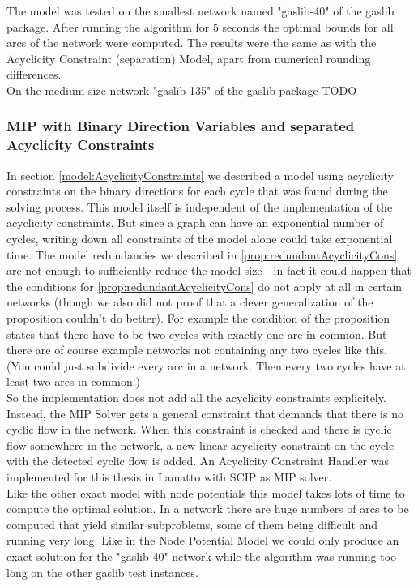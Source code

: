 The model was tested on the smallest network named "gaslib-40" of the gaslib package. After running the algorithm for 5 
seconds the optimal bounds for all arcs of the network were computed. The results were the same as with the Acyclicity 
Constraint (separation) Model, apart from numerical rounding differences. \\

On the medium size network "gaslib-135" of the gaslib package TODO


\subsubsection{MIP with Binary Direction Variables and separated Acyclicity Constraints}
In section \ref{model:AcyclicityConstraints} we described a model using acyclicity constraints on the binary directions 
for each cycle that was found during the solving process.
This model itself is independent of the implementation of the acyclicity constraints. But since a graph can have an 
exponential number of cycles, writing down all constraints of the model alone could take exponential time. The 
model redundancies we described in \ref{prop:redundantAcyclicityCons} are not enough to sufficiently reduce the model 
size - in fact it could happen that the conditions for \ref{prop:redundantAcyclicityCons} do not apply at all in 
certain networks (though we also did not proof that a clever generalization of the proposition couldn't do better). 
For example the condition of the proposition states that there have to be two cycles with exactly one arc in common. 
But there are of course example networks not containing any two cycles like this. (You could just subdivide every arc 
in a network. Then every two cycles have at least two arcs in common.)\\

So the implementation does not add all the acyclicity constraints explicitely. Instead, the MIP Solver gets a 
general constraint that demands that there is no cyclic flow in the network. When this constraint is checked and there 
is cyclic flow somewhere in the network, a new linear acyclicity constraint on the cycle with the detected cyclic flow 
is added. An Acyclicity Constraint Handler was implemented for this thesis in Lamatto with SCIP as MIP solver. \\

Like the other exact model with node potentials this model takes lots of time to compute the optimal solution. In 
a network there are huge numbers of arcs to be computed that yield similar subproblems, some of them being 
difficult and running very long. Like in the Node Potential Model we could only produce an exact solution for the 
"gaslib-40" network while the algorithm was running too long on the other gaslib test instances.

